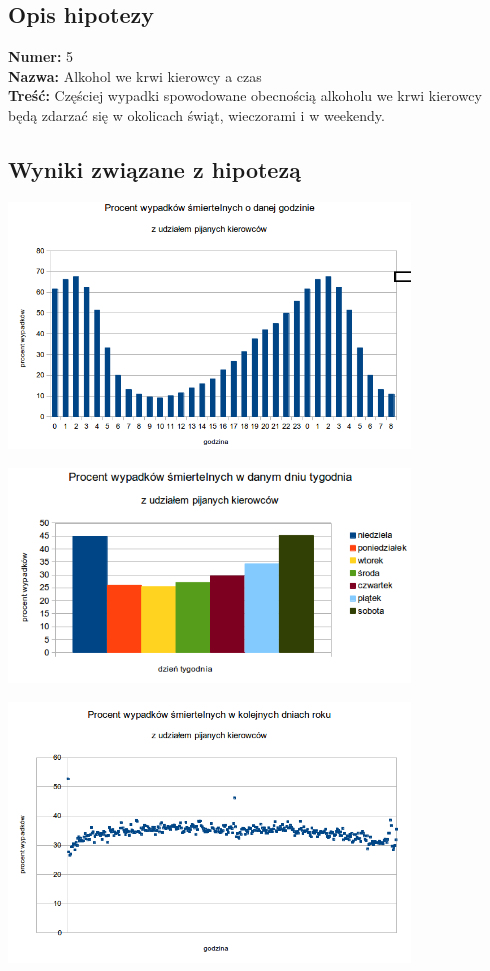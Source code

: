 \subsection{Opis hipotezy}\label{opis-hipotezy}

\textbf{Numer:} 5\\\textbf{Nazwa:} Alkohol we krwi kierowcy a
czas\\\textbf{Treść:} Częściej wypadki spowodowane obecnością alkoholu
we krwi kierowcy będą zdarzać się w okolicach świąt, wieczorami i w
weekendy.

\subsection{Wyniki związane z
hipotezą}\label{wyniki-zwiazane-z-hipoteza}

\includegraphics[width=0.8\textwidth]{images/hipotheses/drunk_drivers/hour.png}

\includegraphics[width=0.8\textwidth]{images/hipotheses/drunk_drivers/day_of_week.png}

\includegraphics[width=0.8\textwidth]{images/hipotheses/drunk_drivers/day_of_year.png}

